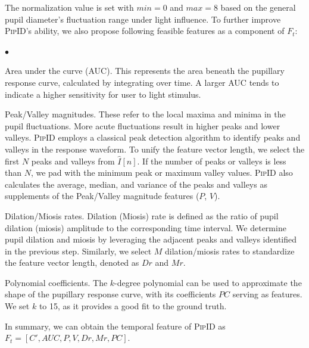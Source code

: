 \documentclass[sigconf]{acmart}
\newcommand{\sysname}{\textsc{PipID}\xspace}
\newenvironment{packeditemize}{
\begin{list}{$\bullet$}{
\setlength{\labelwidth}{8pt}
\setlength{\itemsep}{2pt}
\setlength{\leftmargin}{\labelwidth}
\addtolength{\leftmargin}{\labelsep}
\setlength{\parindent}{0pt}
\setlength{\listparindent}{\parindent}
\setlength{\parsep}{0pt}
\setlength{\topsep}{3pt}}}{\end{list}}
\begin{document}
The normalization value is set with $min = 0$ and $max=8$ based on the general pupil diameter's fluctuation range under light influence.
To further improve \sysname's ability, we also propose following feasible features as a component of $F_t$:
\begin{packeditemize} 
    \item Area under the curve (AUC). This represents the area beneath the pupillary response curve, calculated by integrating over time. A larger AUC tends to indicate a higher sensitivity for user to light stimulus.
    \item Peak/Valley magnitudes. These refer to the local maxima and minima in the pupil fluctuations. More acute fluctuations result in higher peaks and lower valleys. \sysname employs a classical peak detection algorithm to identify peaks and valleys in the response waveform. To unify the feature vector length, we select the first $N$ peaks and valleys from $\hat{I}[n]$. If the number of peaks or valleys is less than $N$, we pad with the minimum peak or maximum valley values. \sysname also calculates the average, median, and variance of the peaks and valleys as supplements of the Peak/Valley magnitude features ($P$, $V$).
    \item Dilation/Miosis rates. Dilation (Miosis) rate is defined as the ratio of pupil dilation (miosis) amplitude to the corresponding time interval. We determine pupil dilation and miosis by leveraging the adjacent peaks and valleys identified in the previous step. Similarly, we select $M$ dilation/miosis rates to standardize the feature vector length, denoted as $Dr$ and $Mr$.
    \item Polynomial coefficients. The $k$-degree polynomial can be used to approximate the shape of the pupillary response curve, with its coefficients $PC$ serving as features. We set $k$ to 15, as it provides a good fit to the ground truth.
\end{packeditemize}

In summary, we can obtain the temporal feature of \sysname as $F_t = [C', AUC, P, V, Dr, Mr, PC]$.
\end{document}
